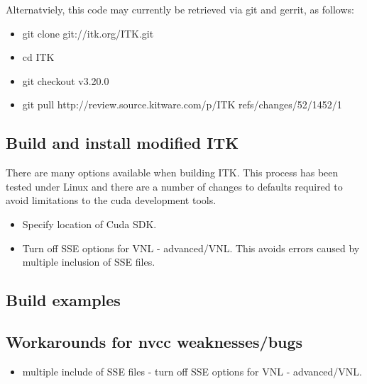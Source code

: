 \documentclass{InsightArticle}
\begin{document}

Alternatviely, this code may currently be retrieved via git and gerrit, as follows:
\begin{itemize}
\item git clone git://itk.org/ITK.git
\item cd ITK
\item git checkout v3.20.0
\item git pull http://review.source.kitware.com/p/ITK refs/changes/52/1452/1
\end{itemize}

\subsection{Build and install modified ITK}
There are many options available when building ITK. This process has
been tested under Linux and there are a number of changes to defaults
required to avoid limitations to the cuda development tools. 
\begin{itemize}
  \item Specify location of Cuda SDK.
  \item Turn off SSE options for VNL - advanced/VNL. This avoids errors caused by multiple inclusion of SSE files.
\end{itemize}

\subsection{Build examples}
\subsection{Workarounds for nvcc weaknesses/bugs}
\begin{itemize}
  \item multiple include of SSE files - turn off SSE options for VNL - advanced/VNL.
\end{itemize}
\end{document}
